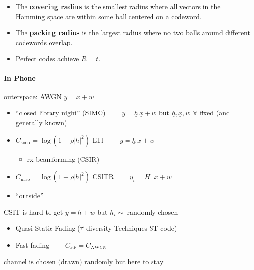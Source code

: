 \documentclass[11pt]{article}
\makeatletter
\providecommand{\tightlist}{%
      \setlength{\itemsep}{0pt}\setlength{\parskip}{0pt}}
\newcommand{\boxspacing}{\kern\kvtcb@left@rule\kern\kvtcb@boxsep}
\newcommand{\prompt}[4]{
        {\ttfamily\llap{{\color{#2}[#3]:\hspace{3pt}#4}}\vspace{-\baselineskip}}
    }
\makeatother
\begin{document}
\begin{itemize}
\tightlist
\item
  The \textbf{covering radius} is the smallest radius where all vectors
  in the Hamming space are within some ball centered on a codeword.
\item
  The \textbf{packing radius} is the largest radius where no two balls
  around different codewords overlap.
\item
  Perfect codes achieve \(R = t\).
\end{itemize}

    \paragraph{In Phone}\label{in-phone}

outerspace: AWGN \(y = x + w\)

\begin{itemize}
\item
  ``closed library night'' (SIMO)
  \(\qquad y = \underline{h} \, \underline{x} + w\) but
  \(\underline{h}, \underline{x}, w\) \(\forall\) fixed (and generally
  known)
\item
  \(C_{\text{simo}} = \log(1 + \rho |h|^2)\) LTI
  \(\qquad \underline{y} = \underline{h} \, x + w\)

  \begin{itemize}
  \tightlist
  \item
    rx beamforming (CSIR)
  \end{itemize}
\item
  \(C_{\text{miso}} = \log(1 + \rho |\underline{h}|^2)\) CSITR
  \(\qquad y_i = H \cdot \underline{x} + \underline{w}\)
\item
  ``outside''
\end{itemize}

CSIT is hard to get \(y = h + w\) but \(h_i \sim\) randomly chosen

\begin{itemize}
\tightlist
\item
  Quasi Static Fading (≠ diversity Techniques ST code)
\item
  Fast fading \(\qquad C_{\text{FF}} = C_{\text{AWGN}}\)
\end{itemize}

\(\boxed{\text{channel is chosen (drawn) randomly but here to stay}}\)

    \begin{tcolorbox}[breakable, size=fbox, boxrule=1pt, pad at break*=1mm,colback=cellbackground, colframe=cellborder]
\prompt{In}{incolor}{ }{\boxspacing}
\begin{Verbatim}[commandchars=\\\{\}]

\end{Verbatim}
\end{tcolorbox}


    
    
    
\end{document}
